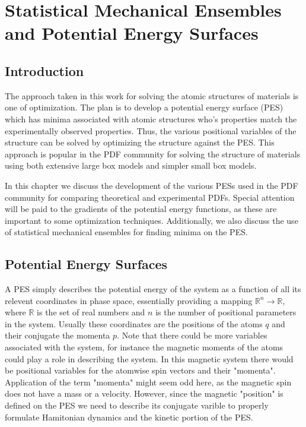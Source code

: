 \chapter{Statistical Mechanical Ensembles and Potential Energy Surfaces} \label{ch:pes_e}
\section{Introduction}
The approach taken in this work for solving the atomic structures of materials is one of optimization.
The plan is to develop a potential energy surface (PES) which has minima associated with atomic structures who's properties match the experimentally observed properties.
Thus, the various positional variables of the structure can be solved by optimizing the structure against the PES.
This approach is popular in the PDF community for solving the structure of materials using both extensive large box models and simpler small box models.

In this chapter we discuss the development of the various PESs used in the PDF community for comparing theoretical and experimental PDFs.
Special attention will be paid to the gradients of the potential energy functions, as these are important to some optimization techniques.
Additionally, we also discuss the use of statistical mechanical ensembles for finding minima on the PES.

\section{Potential Energy Surfaces} \label{sec:pes}
A PES simply describes the potential energy of the system as a function of all its relevent coordinates in phase space, essentially providing a mapping $\mathbb{R}^{n} \rightarrow \mathbb{R}$, where $\mathbb{R}$ is the set of real numbers and $n$ is the number of positional parameters in the system.
Usually these coordinates are the positions of the atoms $q$ and their conjugate the momenta $p$.
Note that there could be more variables associated with the system, for instance the magnetic moments of the atoms could play a role in describing the system.
In this magnetic system there would be positional variables for the atomwise spin vectors and their "momenta".
Application of the term "momenta" might seem odd here, as the magnetic spin does not have a mass or a velocity.
However, since the magnetic "position" is defined on the PES we need to describe its conjugate varible to properly formulate Hamitonian dynamics and the kinetic portion of the PES.

